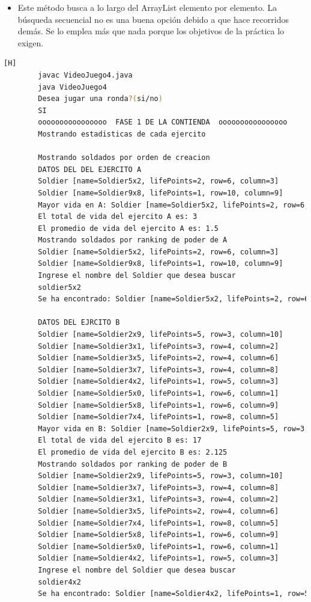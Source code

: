 \documentclass{article}
\begin{document}
	\begin{itemize}	
		\item Este método busca a lo largo del ArrayList elemento por elemento. La búsqueda secuencial no es una buena opción debido a que hace recorridos demás. Se lo emplea más que nada porque los objetivos de la práctica lo exigen.
	\end{itemize}
	
	\begin{lstlisting}[language=bash,caption={Compilando y probando el código terminado  }][H]
		javac VideoJuego4.java
		java VideoJuego4
		Desea jugar una ronda?(si/no)
		SI
		oooooooooooooooo  FASE 1 DE LA CONTIENDA  oooooooooooooooo
		Mostrando estadisticas de cada ejercito
		
		Mostrando soldados por orden de creacion
		DATOS DEL DEL EJERCITO A
		Soldier [name=Soldier5x2, lifePoints=2, row=6, column=3]
		Soldier [name=Soldier9x8, lifePoints=1, row=10, column=9]
		Mayor vida en A: Soldier [name=Soldier5x2, lifePoints=2, row=6, column=3]
		El total de vida del ejercito A es: 3
		El promedio de vida del ejercito A es: 1.5
		Mostrando soldados por ranking de poder de A
		Soldier [name=Soldier5x2, lifePoints=2, row=6, column=3]
		Soldier [name=Soldier9x8, lifePoints=1, row=10, column=9]
		Ingrese el nombre del Soldier que desea buscar
		soldier5x2
		Se ha encontrado: Soldier [name=Soldier5x2, lifePoints=2, row=6, column=3]
		
		DATOS DEL EJRCITO B
		Soldier [name=Soldier2x9, lifePoints=5, row=3, column=10]
		Soldier [name=Soldier3x1, lifePoints=3, row=4, column=2]
		Soldier [name=Soldier3x5, lifePoints=2, row=4, column=6]
		Soldier [name=Soldier3x7, lifePoints=3, row=4, column=8]
		Soldier [name=Soldier4x2, lifePoints=1, row=5, column=3]
		Soldier [name=Soldier5x0, lifePoints=1, row=6, column=1]
		Soldier [name=Soldier5x8, lifePoints=1, row=6, column=9]
		Soldier [name=Soldier7x4, lifePoints=1, row=8, column=5]
		Mayor vida en B: Soldier [name=Soldier2x9, lifePoints=5, row=3, column=10]
		El total de vida del ejercito B es: 17
		El promedio de vida del ejercito B es: 2.125
		Mostrando soldados por ranking de poder de B
		Soldier [name=Soldier2x9, lifePoints=5, row=3, column=10]
		Soldier [name=Soldier3x7, lifePoints=3, row=4, column=8]
		Soldier [name=Soldier3x1, lifePoints=3, row=4, column=2]
		Soldier [name=Soldier3x5, lifePoints=2, row=4, column=6]
		Soldier [name=Soldier7x4, lifePoints=1, row=8, column=5]
		Soldier [name=Soldier5x8, lifePoints=1, row=6, column=9]
		Soldier [name=Soldier5x0, lifePoints=1, row=6, column=1]
		Soldier [name=Soldier4x2, lifePoints=1, row=5, column=3]
		Ingrese el nombre del Soldier que desea buscar
		soldier4x2
		Se ha encontrado: Soldier [name=Soldier4x2, lifePoints=1, row=5, column=3]
		

\end{lstlisting}
\end{document}

